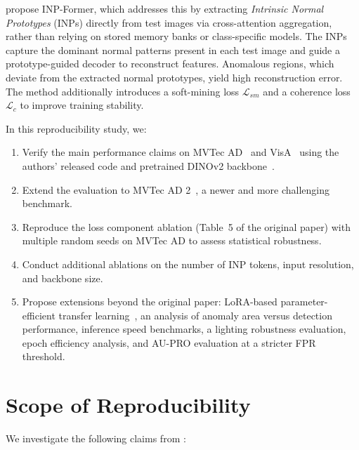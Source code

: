 \documentclass[10pt]{article} %
\begin{document}
\citet{inp_former_2025} propose INP-Former, which addresses this by extracting \emph{Intrinsic Normal Prototypes} (INPs) directly from test images via cross-attention aggregation, rather than relying on stored memory banks or class-specific models. The INPs capture the dominant normal patterns present in each test image and guide a prototype-guided decoder to reconstruct features. Anomalous regions, which deviate from the extracted normal prototypes, yield high reconstruction error. The method additionally introduces a soft-mining loss $\mathcal{L}_{sm}$ and a coherence loss $\mathcal{L}_c$ to improve training stability.

In this reproducibility study, we:
\begin{enumerate}
    \item Verify the main performance claims on MVTec AD~\citep{bergmann2019mvtec} and VisA~\citep{zou2022visa} using the authors' released code and pretrained DINOv2 backbone~\citep{oquab2024dinov2}.
    \item Extend the evaluation to MVTec AD 2~\citep{mvtecad2_2024}, a newer and more challenging benchmark.
    \item Reproduce the loss component ablation (Table~5 of the original paper) with multiple random seeds on MVTec AD to assess statistical robustness.
    \item Conduct additional ablations on the number of INP tokens, input resolution, and backbone size.
    \item Propose extensions beyond the original paper: LoRA-based parameter-efficient transfer learning~\citep{hu2022lora}, an analysis of anomaly area versus detection performance, inference speed benchmarks, a lighting robustness evaluation, epoch efficiency analysis, and AU-PRO evaluation at a stricter FPR threshold.
\end{enumerate}


\section{Scope of Reproducibility}
\label{sec:scope}

We investigate the following claims from \citet{inp_former_2025}:
\end{document}
